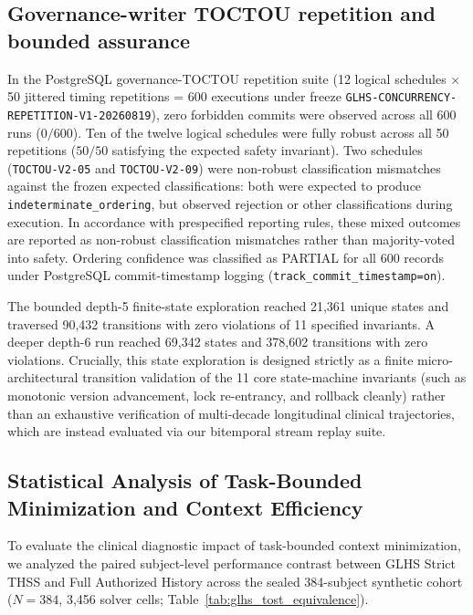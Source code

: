 \documentclass[11pt]{article}
\begin{document}
\subsection{Governance-writer TOCTOU repetition and bounded assurance}
In the PostgreSQL governance-TOCTOU repetition suite (12 logical schedules $\times$ 50 jittered timing repetitions = 600 executions under freeze \nolinkurl{GLHS-CONCURRENCY-REPETITION-V1-20260819}), zero forbidden commits were observed across all 600 runs ($0/600$). Ten of the twelve logical schedules were fully robust across all 50 repetitions ($50/50$ satisfying the expected safety invariant). Two schedules (\texttt{TOCTOU-V2-05} and \texttt{TOCTOU-V2-09}) were non-robust classification mismatches against the frozen expected classifications: both were expected to produce \texttt{indeterminate\_ordering}, but observed rejection or other classifications during execution. In accordance with prespecified reporting rules, these mixed outcomes are reported as non-robust classification mismatches rather than majority-voted into safety. Ordering confidence was classified as PARTIAL for all 600 records under PostgreSQL commit-timestamp logging (\texttt{track\_commit\_timestamp=on}).

The bounded depth-5 finite-state exploration reached 21,361 unique states and traversed 90,432 transitions with zero violations of 11 specified invariants. A deeper depth-6 run reached 69,342 states and 378,602 transitions with zero violations. Crucially, this state exploration is designed strictly as a finite micro-architectural transition validation of the 11 core state-machine invariants (such as monotonic version advancement, lock re-entrancy, and rollback cleanly) rather than an exhaustive verification of multi-decade longitudinal clinical trajectories, which are instead evaluated via our bitemporal stream replay suite.

\subsection{Statistical Analysis of Task-Bounded Minimization and Context Efficiency}
To evaluate the clinical diagnostic impact of task-bounded context minimization, we analyzed the paired subject-level performance contrast between GLHS Strict THSS and Full Authorized History across the sealed 384-subject synthetic cohort ($N=384$, 3,456 solver cells; Table~\ref{tab:glhs_tost_equivalence}).
\end{document}
